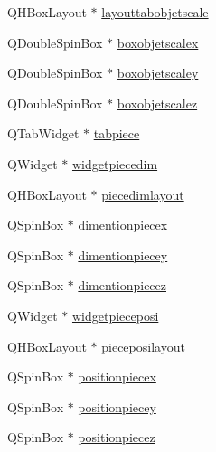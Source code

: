 \begin{DoxyCompactItemize}
\item 
Q\+H\+Box\+Layout $\ast$ \hyperlink{class_mondock_a7337ba165d8f7543e3469a2a25f3f062}{layouttabobjetscale}
\item 
Q\+Double\+Spin\+Box $\ast$ \hyperlink{class_mondock_a0300855d7d2e07ff9f29acfe6aabf86a}{boxobjetscalex}
\item 
Q\+Double\+Spin\+Box $\ast$ \hyperlink{class_mondock_a111e6d0603d220eafef5fe6754ee5686}{boxobjetscaley}
\item 
Q\+Double\+Spin\+Box $\ast$ \hyperlink{class_mondock_a23022e2424b108b94b9519167b702b2a}{boxobjetscalez}
\item 
Q\+Tab\+Widget $\ast$ \hyperlink{class_mondock_a5985ccaca36a0e545e6e74a84623b1a9}{tabpiece}
\item 
Q\+Widget $\ast$ \hyperlink{class_mondock_abe21ad30be63590c6ce6e18969e9f082}{widgetpiecedim}
\item 
Q\+H\+Box\+Layout $\ast$ \hyperlink{class_mondock_af9d31eb2800c5608dc9da41dcf1ca1d0}{piecedimlayout}
\item 
Q\+Spin\+Box $\ast$ \hyperlink{class_mondock_ab3829ab678beb2bc391bdb325b0beda1}{dimentionpiecex}
\item 
Q\+Spin\+Box $\ast$ \hyperlink{class_mondock_a60c16f4209470967b672f33a2c4fe67c}{dimentionpiecey}
\item 
Q\+Spin\+Box $\ast$ \hyperlink{class_mondock_ab9605a7a3ee01aec5f5b29fc111abdeb}{dimentionpiecez}
\item 
Q\+Widget $\ast$ \hyperlink{class_mondock_a960802e2aa94a22487ff03bbaa102a02}{widgetpieceposi}
\item 
Q\+H\+Box\+Layout $\ast$ \hyperlink{class_mondock_a676e96b53de7e8e4fd8f82c990b074df}{pieceposilayout}
\item 
Q\+Spin\+Box $\ast$ \hyperlink{class_mondock_ab93f251cb0119893cc7aadcd3ffb8eb1}{positionpiecex}
\item 
Q\+Spin\+Box $\ast$ \hyperlink{class_mondock_a82edda6549941e9c67700ed4562abba7}{positionpiecey}
\item 
Q\+Spin\+Box $\ast$ \hyperlink{class_mondock_ac4aa7f84daff43586674a324e0a69e24}{positionpiecez}
\end{DoxyCompactItemize}


